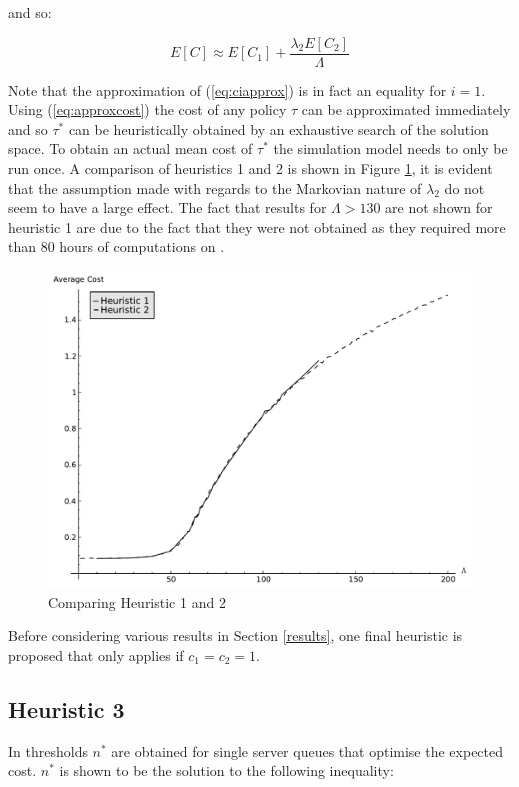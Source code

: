 \documentclass[12pt]{article}
\begin{document}
and so:

\begin{equation}\label{eq:approxcost}
E[C]\approx E[C_1] + \frac{\lambda_2E[C_2]}{\Lambda}
\end{equation}

Note that the approximation of (\ref{eq:ciapprox}) is in fact an equality for $i=1$.
Using (\ref{eq:approxcost}) the cost of any policy $\tau$ can be approximated immediately and so $\tau^*$ can be heuristically obtained by an exhaustive search of the solution space.
To obtain an actual mean cost of $\tau^*$ the simulation model needs to only be run once.
A comparison of heuristics 1 and 2 is shown in Figure \ref{casestudycomp}, it is evident that the assumption made with regards to the Markovian nature of $\lambda_2$ do not seem to have a large effect.
The fact that results for $\Lambda >130$ are not shown for heuristic 1 are due to the fact that they were not obtained as they required more than 80 hours of computations on \cite{web002}.

\begin{figure}[!hbtp]
    \begin{center}
        \includegraphics[width=.6\textwidth]{Images/CaseStudyComp.pdf}
    \end{center}
    \caption{Comparing Heuristic 1 and 2}\label{casestudycomp}
\end{figure}

Before considering various results in Section \ref{results}, one final heuristic is proposed that only applies if $c_1=c_2=1$.

\subsection{Heuristic 3}\label{heuristic3}

In \cite{Naor} thresholds $n^*$ are obtained for single server queues that optimise the expected cost. $n^*$ is shown to be the solution to the following inequality:
\end{document}
